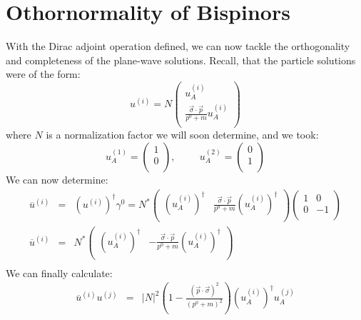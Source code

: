\documentclass[12pt]{article}
\begin{document}
\section{Othornormality of Bispinors}

With the Dirac adjoint operation defined, we can now tackle the orthogonality and completeness of the plane-wave solutions.  Recall, that the particle solutions were of the form:
$$u^{(i)} = N \begin{pmatrix}  \displaystyle u_A^{(i)} \\[5pt] \displaystyle \frac{\vec{\sigma}\cdot\vec{p}}{p^0 + m} u_A^{(i)}\\ \end{pmatrix}$$
where $N$ is a normalization factor we will soon determine, and we took:
$$u_A^{(1)}=\begin{pmatrix} 1 \\ 0 \\ \end{pmatrix}, \hspace{1cm} u_A^{(2)}=\begin{pmatrix} 0 \\ 1 \\ \end{pmatrix}$$
We can now determine:
\begin{eqnarray*}
\overline{u}^{(i)} &=& (u^{(i)})^\dagger \gamma^0 =
N^*
\begin{pmatrix}
\displaystyle (u_A^{(i)})^\dagger & \displaystyle \frac{\vec{\sigma}\cdot\vec{p}}{p^0 + m} (u_A^{(i)})^\dagger \\
\end{pmatrix}
\begin{pmatrix} 1 & 0 \\ 0 & -1 \\ \end{pmatrix}\\
\overline{u}^{(i)} &=& N^* \begin{pmatrix}
\displaystyle (u_A^{(i)})^\dagger & \displaystyle -\frac{\vec{\sigma}\cdot\vec{p}}{p^0 + m} (u_A^{(i)})^\dagger \\
\end{pmatrix} \\
\end{eqnarray*}
We can finally calculate:
\begin{eqnarray*}
\overline{u}^{(i)} u^{(j)} &=& |N|^2 \left( 1 - \frac{(\vec{p}\cdot \vec{\sigma})^2}{(p^0+m)^2}\right) (u_A^{(i)})^\dagger u_A^{(j)}\\
\end{eqnarray*}
\end{document}
